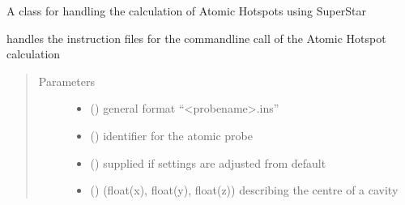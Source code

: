 \documentclass[letterpaper,10pt,english]{sphinxmanual}
\begin{document}
\begin{fulllineitems}
\label{\detokenize{atomic_hotspot_calculation_api:hotspots.atomic_hotspot_calculation.AtomicHotspot}}
A class for handling the calculation of Atomic Hotspots using SuperStar

\begin{fulllineitems}
\label{\detokenize{atomic_hotspot_calculation_api:hotspots.atomic_hotspot_calculation.AtomicHotspot.InstructionFile}}
handles the instruction files for the commandline call of the Atomic Hotspot calculation
\begin{quote}\begin{description}
\item[{Parameters}] \leavevmode\begin{itemize}
\item {} 
 () \textendash{} general format “\textless{}probename\textgreater{}.ins”

\item {} 
 () \textendash{} identifier for the atomic probe

\item {} 
 () \textendash{} supplied if settings are adjusted from default

\item {} 
 () \textendash{} (float(x), float(y), float(z)) describing the centre of a cavity

\end{itemize}

\end{description}\end{quote}


\end{fulllineitems}
\end{fulllineitems}
\end{document}
